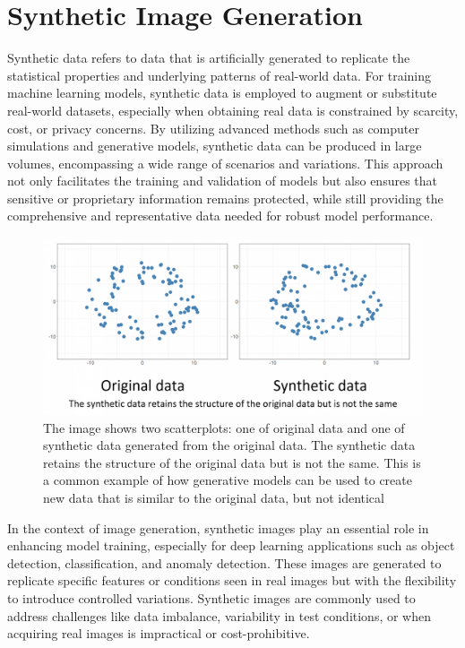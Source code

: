\documentclass[12pt,DIV14,BCOR12mm,a4paper,footinclude=false,headinclude,parskip=half-,twoside,openright,cleardoublepage=empty,toc=index,bibliography=totoc,listof=totoc]{scrreprt}
\numberwithin{equation}{chapter}
\begin{document}
\section{Synthetic Image Generation}
Synthetic data refers to data that is artificially generated to replicate the statistical properties and underlying patterns of real-world data. For training machine learning models, synthetic data is employed to augment or substitute real-world datasets, especially when obtaining real data is constrained by scarcity, cost, or privacy concerns. By utilizing advanced methods such as computer simulations and generative models, synthetic data can be produced in large volumes, encompassing a wide range of scenarios and variations. This approach not only facilitates the training and validation of models but also ensures that sensitive or proprietary information remains protected, while still providing the comprehensive and representative data needed for robust model performance.
\begin{figure}
	\centering
	\includegraphics[scale=.3]{../media/synthetic_data_image-1536x718.png}
	\caption{The image shows two scatterplots: one of original data and one of synthetic data generated from the original data. The synthetic data retains the structure of the original data but is not the same. This is a common example of how generative models can be used to create new data that is similar to the original data, but not identical~\cite{Karen:2020}}
	\label{synthetic_data}
\end{figure}
In the context of image generation, synthetic images play an essential role in enhancing model training, especially for deep learning applications such as object detection, classification, and anomaly detection. These images are generated to replicate specific features or conditions seen in real images but with the flexibility to introduce controlled variations. Synthetic images are commonly used to address challenges like data imbalance, variability in test conditions, or when acquiring real images is impractical or cost-prohibitive.
\end{document}
